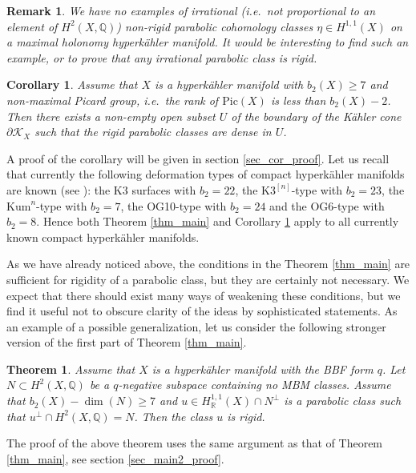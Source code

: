 \documentclass[11pt]{article}
\newcommand{\6}{\partial}
\newcommand{\Q}{\mathbb{Q}}
\newcommand{\bbQ}{\mathbb{Q}}
\newcommand{\bbR}{\mathbb{R}}
\newcommand{\KK}{\mathcal{K}}
\renewcommand{\ge}{\geqslant}
\newtheorem{thm}[defn]{Theorem}
\newtheorem{cor}[defn]{Corollary}
\newtheorem{rem}[defn]{Remark}
\begin{document}
\begin{rem}
We have no examples of irrational (i.e.\ not proportional to 
an element of $H^2(X,\Q)$) non-rigid parabolic cohomology classes $\eta \in H^{1,1}(X)$
on a maximal holonomy hyperk\"ahler manifold.
It would be interesting to find such an example, or to prove
that any irrational parabolic class is rigid.
\end{rem}


\begin{cor}\label{cor_main}
Assume that $X$ is a hyperk\"ahler manifold with $b_2(X)\ge 7$
and non-maximal Picard group, i.e.\ the rank of $\mathrm{Pic}(X)$ is less than $b_2(X)-2$.
Then there exists a non-empty open subset $U$ of the boundary of the K\"ahler cone $\partial \KK_X$
such that the rigid parabolic classes are dense in $U$.
\end{cor}

A proof of the corollary will be given in section \ref{sec_cor_proof}. Let us recall that
currently the following deformation types of compact hyperk\"ahler manifolds are known (see \cite{Ma}):
the K3 surfaces with $b_2 = 22$,
the $\mathrm{K3}^{[n]}$-type with $b_2 = 23$, the $\mathrm{Kum}^n$-type with $b_2 = 7$, the OG10-type with $b_2=24$
and the OG6-type with $b_2=8$. Hence both Theorem \ref{thm_main} and Corollary \ref{cor_main}
apply to all currently known compact hyperk\"ahler manifolds.

As we have already noticed above, the conditions in the Theorem \ref{thm_main}
are sufficient for rigidity of a parabolic class, but they are certainly
not necessary. We expect that there should exist many ways of weakening these
conditions, but we find it useful not to obscure clarity of the ideas
by sophisticated statements. As an example of a possible generalization,
let us consider the following stronger version of the first
part of Theorem \ref{thm_main}.

\begin{thm}\label{thm_main2}
Assume that $X$ is a hyperk\"ahler manifold with the BBF form $q$.
Let $N\subset H^2(X,\bbQ)$ be a $q$-negative subspace containing no MBM classes. Assume that  $b_2(X) - \dim(N)\ge 7$
and $u\in H^{1,1}_\bbR(X)\cap N^\perp$ is a parabolic class such that $u^\perp\cap H^2(X,\bbQ) = N$.
Then the class $u$ is rigid.
\end{thm}

The proof of the above theorem uses the 
same argument as that of Theorem \ref{thm_main},
see section \ref{sec_main2_proof}.
\end{document}

